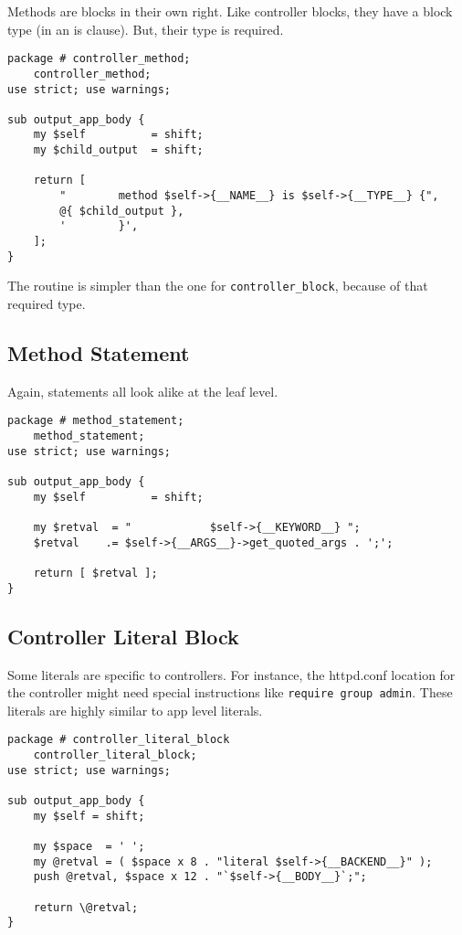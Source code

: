 Methods are blocks in their own right.  Like controller blocks, they
have a block type (in an is clause).  But, their type is required.

\begin{verbatim}
package # controller_method;
    controller_method;
use strict; use warnings;

sub output_app_body {
    my $self          = shift;
    my $child_output  = shift;

    return [
        "        method $self->{__NAME__} is $self->{__TYPE__} {",
        @{ $child_output },
        '        }',
    ];
}
\end{verbatim}

The routine is simpler than the one for \verb+controller_block+, because
of that required type.

\subsection*{Method Statement}

Again, statements all look alike at the leaf level.

\begin{verbatim}
package # method_statement;
    method_statement;
use strict; use warnings;

sub output_app_body {
    my $self          = shift;

    my $retval  = "            $self->{__KEYWORD__} ";
    $retval    .= $self->{__ARGS__}->get_quoted_args . ';';

    return [ $retval ];
}
\end{verbatim}

\subsection*{Controller Literal Block}

Some literals are specific to controllers.  For instance, the httpd.conf
location for the controller might need special instructions like
\verb+require group admin+.  These literals are highly similar to app
level literals.

\begin{verbatim}
package # controller_literal_block
    controller_literal_block;
use strict; use warnings;

sub output_app_body {
    my $self = shift;

    my $space  = ' ';
    my @retval = ( $space x 8 . "literal $self->{__BACKEND__}" );
    push @retval, $space x 12 . "`$self->{__BODY__}`;";

    return \@retval;
}
\end{verbatim}

